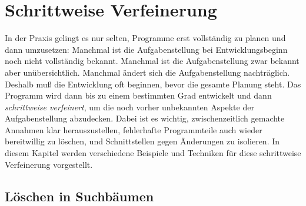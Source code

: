 
\chapter{Schrittweise Verfeinerung}
\label{cha:iterative-refinement}

 In
der Praxis gelingt es nur selten, Programme erst vollständig zu planen
und dann umzusetzen: Manchmal ist die Aufgabenstellung bei
Entwicklungsbeginn noch nicht vollständig bekannt.  Manchmal ist die
Aufgabenstellung zwar bekannt aber unübersichtlich. Manchmal ändert
sich die Aufgabenstellung nachträglich.  Deshalb muß die Entwicklung
oft beginnen, bevor die gesamte Planung steht.  Das Programm wird dann
bis zu einem bestimmten Grad entwickelt und dann \textit{schrittweise
  verfeinert}, um die noch vorher unbekannten Aspekte der
Aufgabenstellung abzudecken.  Dabei ist es wichtig, zwischenzeitlich
gemachte Annahmen klar herauszustellen, fehlerhafte Programmteile auch
wieder bereitwillig zu löschen, und Schnittstellen gegen Änderungen zu
isolieren.  In diesem Kapitel werden verschiedene Beispiele und
Techniken für diese schrittweise Verfeinerung vorgestellt.

\section{Löschen in Suchbäumen}
\label{sec:search-tree-delete}

